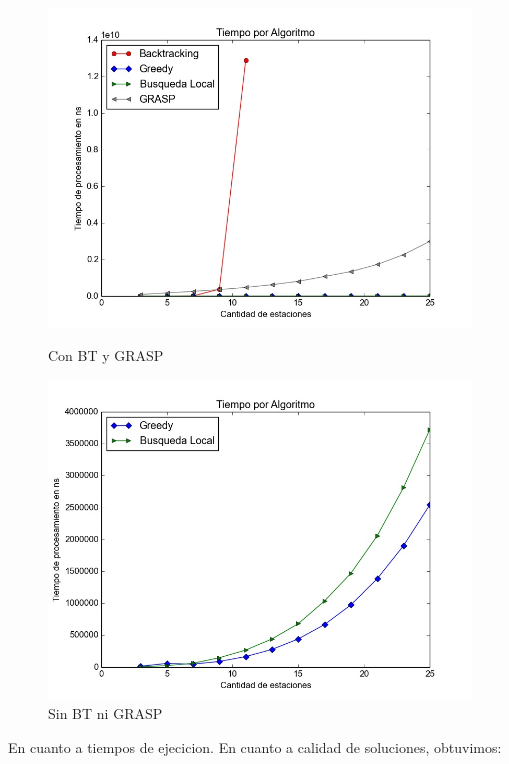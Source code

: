       \begin{figure}[H]
          \includegraphics[width=\linewidth]{imagenes/exp2_ej5_tiempo_con_BT.jpeg}
          \caption{Con BT y GRASP}
        \endminipage\hfill
          \includegraphics[width=\linewidth]{imagenes/exp2_ej5_tiempo_sin_BT_ni_GRASP.jpeg}
          \caption{Sin BT ni GRASP}
        \endminipage
        \end{figure}

        En cuanto a tiempos de ejecicion.
        En cuanto a calidad de soluciones, obtuvimos:


